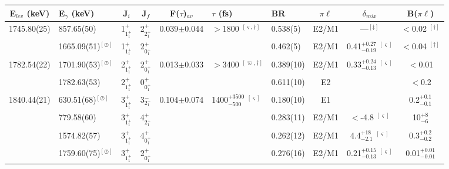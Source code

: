 \begin{landscape}
\begin{center}
\begin{longtable}{clcccllccc}
E$_{lev}$ (keV) & E$_\gamma$ (keV)        & J$_i$              & J$_f$        & F($\tau$)$_{av}$ & $\tau$ (fs)                           & BR        & $\pi\ell$ & $\delta_{mix}$      & B($\pi\ell$) \\
\hline \hline \endhead
 1745.80(25)&   857.65(50)               & 1$^+_{1^+_1}$ & 2$^+_{2^+_1}$      &0.039$\pm$0.044& $>$1800 $^{[\varsigma,\dagger]}$                &0.538(5)             & E2/M1 & ---$^{[\ddagger]}$                   & $<$0.02 $^{[\dagger]}$        \\
            &  1665.09(51)$^{[\oslash]}$ & 1$^+_{1^+_1}$ & 2$^+_{0^+_1}$      &&                                                            &0.462(5)             & E2/M1 & 0.41$^{+0.27}_{-0.19}$ $^{[\varsigma]}$  & $<$0.04 $^{[\dagger]}$    \\ 
 1782.54(22)&  1701.90(53)$^{[\oslash]}$ & 2$^+_{1^+_1}$ & 2$^+_{0^+_1}$      &0.013$\pm$0.033& $>$3400 $^{[\varpi,\dagger]}$              &0.389(10)            & E2/M1  & 0.33$^{+0.24}_{-0.13}$ $^{[\varsigma]}$ & $<$0.01       \\
            &  1782.63(53)               & 2$^+_{1^+_1}$ & 0$^+_{0^+_1}$      & &                                                           &0.611(10)            & E2     &                                     & $<$0.2       \\ 
 1840.44(21)&   630.51(68)$^{[\oslash]}$ & 3$^+_{1^+_1}$ & 3$^-_{2^-_1}$      &0.104$\pm$0.074& 1400$^{+3500}_{-500}$ $^{[\varsigma]}$          &0.180(10)            & E1    &                                      & 0.2$^{+0.1}_{-0.1}$          \\
            &   779.58(60)               & 3$^+_{1^+_1}$ & 4$^+_{2^+_1}$      &&                                                            &0.283(11)            & E2/M1 & $<$-4.8 $^{[\varsigma]}$                 & 10$^{+8}_{-6}$   \\
            &  1574.82(57)               & 3$^+_{1^+_1}$ & 4$^+_{0^+_1}$      &&                                                            &0.262(12)            & E2/M1 & 4.4$^{+18}_{-2.1}$ $^{[\varsigma]}$      & 0.3$^{+0.2}_{-0.2}$        \\
            &  1759.60(75)$^{[\oslash]}$ & 3$^+_{1^+_1}$ & 2$^+_{0^+_1}$      &&                                                            &0.276(16)            & E2/M1 & 0.21$^{+0.15}_{-0.13}$ $^{[\varsigma]}$  & 0.01$^{+0.01}_{-0.01}$         \\ 

\end{longtable}
\end{center}
\end{landscape}
